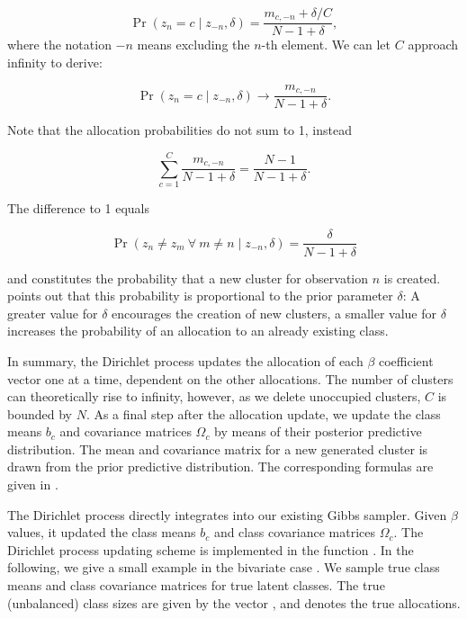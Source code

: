 \documentclass[article]{jss}
\newcommand{\fct}[1]{\code{#1()}}
\begin{document}
$$ \Pr(z_n = c \mid z_{-n}, \delta) = \frac{m_{c,-n} + \delta/C}{N-1+\delta},$$
where the notation $-n$ means excluding the $n$-th element. We can let $C$ approach infinity to derive:

$$ \Pr(z_n = c \mid z_{-n}, \delta) \to \frac{m_{c,-n}}{N-1+\delta}. $$

Note that the allocation probabilities do not sum to 1, instead

$$ \sum_{c = 1}^C \frac{m_{c,-n}}{N-1+\delta} = \frac{N-1}{N-1+\delta}. $$

The difference to 1 equals

$$ \Pr(z_n \neq z_m ~ \forall ~ m \neq n \mid z_{-n}, \delta) = \frac{\delta}{N-1+\delta} $$

and constitutes the probability that a new cluster for observation $n$ is created. \cite{Neal:2000} points out that this probability is proportional to the prior parameter $\delta$: A greater value for $\delta$ encourages the creation of new clusters, a smaller value for $\delta$ increases the probability of an allocation to an already existing class.

In summary, the Dirichlet process updates the allocation of each $\beta$ coefficient vector one at a time, dependent on the other allocations. The number of clusters can theoretically rise to infinity, however, as we delete unoccupied clusters, $C$ is bounded by $N$. As a final step after the allocation update, we update the class means $b_c$ and covariance matrices $\Omega_c$ by means of their posterior predictive distribution. The mean and covariance matrix for a new generated cluster is drawn from the prior predictive distribution. The corresponding formulas are given in \cite{Li:2019}.

The Dirichlet process directly integrates into our existing Gibbs sampler. Given $\beta$ values, it updated the class means $b_c$ and class covariance matrices $\Omega_c$. The Dirichlet process updating scheme is implemented in the function \fct{update\_classes\_dp}. In the following, we give a small example in the bivariate case . We sample true class means  and class covariance matrices  for  true latent classes. The true (unbalanced) class sizes are given by the vector , and  denotes the true allocations.
\end{document}
